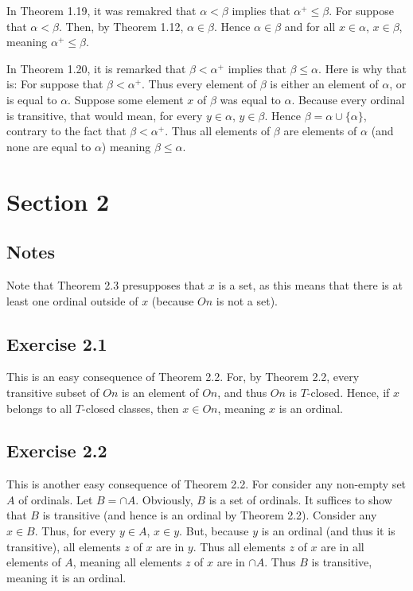 \documentclass{article}
\theoremstyle{definition}
\begin{document}
In Theorem 1.19, it was remakred that $\alpha<\beta$ implies that $\alpha^+\le\beta$. For suppose that 
$\alpha<\beta$. Then, by Theorem 1.12, $\alpha\in\beta$. Hence $\alpha\in\beta$ and for all $x\in\alpha$, 
$x\in\beta$, meaning $\alpha^+\le\beta$.

In Theorem 1.20, it is remarked that $\beta<\alpha^+$ implies that $\beta\le\alpha$. Here is why that is: For suppose that 
$\beta<\alpha^+$. Thus every element of $\beta$ is either an element of $\alpha$, or is equal to $\alpha$. Suppose 
some element $x$ of $\beta$ was equal to $\alpha$. Because every ordinal is transitive, that would mean, for every 
$y\in\alpha$, $y\in\beta$. Hence $\beta=\alpha\cup\{\alpha\}$, contrary to the fact that $\beta<\alpha^+$. Thus all elements of 
$\beta$ are elements of $\alpha$ (and none are equal to $\alpha$) meaning $\beta\le\alpha$.

\section*{Section 2}

\subsection*{Notes}
Note that Theorem 2.3 presupposes that $x$ is a set, as this means that there is at least one ordinal outside of 
$x$ (because $On$ is not a set).

\subsection*{Exercise 2.1}
This is an easy consequence of Theorem 2.2. For, by Theorem 2.2, every transitive subset of $On$ is an element of $On$, and 
thus $On$ is $T$-closed. Hence, if $x$ belongs to all $T$-closed classes, then $x\in On$, meaning $x$ is an ordinal.

\subsection*{Exercise 2.2}
This is another easy consequence of Theorem 2.2. For consider any non-empty set $A$ of ordinals. 
Let $B=\cap A$. Obviously, $B$ is a set of ordinals. It suffices to show that $B$ is transitive (and hence is an 
ordinal by Theorem 2.2). Consider any $x\in B$. Thus, for every $y\in A$, $x\in y$. But, because $y$ is an 
ordinal (and thus it is transitive), all elements $z$ of $x$ are in $y$. Thus all elements $z$ of $x$ are 
in all elements of $A$, meaning all elements $z$ of $x$ are in $\cap A$. Thus $B$ is transitive, 
meaning it is an ordinal.
\end{document}
